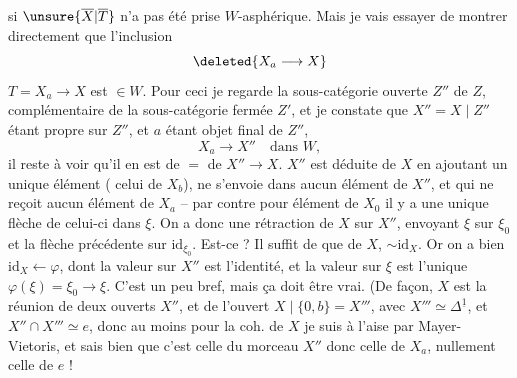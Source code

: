 
si $\unsure{\overline{X}|\overline{T}}$ n'a pas été prise $W$-asphérique. Mais  je vais essayer de montrer directement que l'inclusion
\[
\deleted{X_a\longrightarrow X}
\]
 $T=X_a\longrightarrow X$ est $\in W$. Pour ceci je regarde la sous-catégorie ouverte $Z''$ de $Z$, complémentaire de la sous-catégorie  fermée $Z'$, et je constate que $X''=X\mid Z''$ étant propre sur $Z''$, et $a$ étant objet final de $Z''$, 
\[
X_a\longrightarrow X''\quad\text{dans }W,
\]
il reste à voir qu'il en est de $=$ de $X''\to X$.  $X''$ est déduite de $X$ en ajoutant un unique élément \inserted{$\unsure{\xi|\zeta}$} ( celui de $X_b$),  ne s'envoie dans aucun élément de $X''$, et qui ne reçoit aucun élément de $X_a$ -- par contre pour   élément  de $X_0$ il y a une unique flèche de celui-ci dans $\xi$. On a donc une rétraction de $X$ sur $X''$, envoyant $\xi$ sur $\xi_0$ et la flèche précédente sur $\mathrm{id}_{\xi_0}$. Est-ce   ? Il suffit de   que  \inserted{$\varphi$} de $X$,  $\sim\mathrm{id}_X$. Or on a bien $\mathrm{id}_X\leftarrow\varphi$, dont la valeur sur $X''$ est l'identité, et la valeur sur $\xi$ est l'unique $\varphi(\xi)=\xi_0\longrightarrow\xi$. C'est un peu bref, mais ça doit être vrai. (De  façon, $X$ est la réunion de deux ouverts $X''$, et de l'ouvert $X\mid\{0,b\}=X'''$, avec $X'''\simeq\Delta^{\underline{1}}$, et $X''\cap X'''\simeq e$, donc au moins pour la coh.  de $X$ je suis à l'aise par Mayer-Vietoris, et sais bien que c'est celle du morceau $X''$ donc celle de $X_a$, nullement celle de $e$ !

